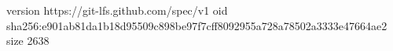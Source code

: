 version https://git-lfs.github.com/spec/v1
oid sha256:e901ab81da1b18d95509c898be97f7cff8092955a728a78502a3333e47664ae2
size 2638
